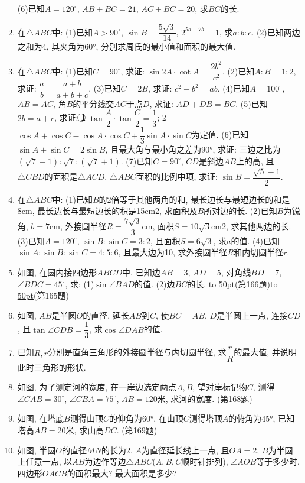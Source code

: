 \documentclass[10pt,a4paper]{article}
\newcommand{\blank}[1]{\underline{\hbox to #1pt{}}}
\begin{document}
\begin{enumerate}[1.]
(6)已知$A=120^\circ$, $AB+BC=21$, $AC+BC=20$, 求$BC$的长.
\item 在$\triangle ABC$中:
(1)已知$A>90^{\circ }$, $\sin B=\dfrac{5\sqrt 3}{14}$, $2^{5a-7b}=1$, 求$a:b:c$.
(2)已知两边之和为4, 其夹角为60°, 分別求周氏的最小值和面积的最大值.
\item 在$\triangle ABC$中:
(1)已知$C=90^{\circ }$, 求证: $\sin 2A\cdot \cot A=\dfrac{2b^2}{c^2}$.
(2)已知$A:B=1:2$, 求证: $\dfrac ab=\dfrac{a+b}{a+b+c}$.
(3)已知$C=2B$, 求证: $c^2-b^2=ab$.
(4)已知$A=100^\circ$, $AB=AC$, 角$B$的平分线交$AC$于点$D$, 求证: $AD+DB=BC$.
(5)已知$2b=a+c$, 求证:
\textcircled{1} $\tan \dfrac A2\cdot \tan \dfrac C2=\dfrac 13$;
\textcircled{2} $\cos A+\cos C-\cos A\cdot \cos C+\dfrac 13\sin A\cdot \sin C$为定值.
(6)已知$\sin A+\sin C=2\sin B$, 且最大角与最小角之差为90°, 求证: 三边之比为$(\sqrt 7-1):\sqrt 7:(\sqrt 7+1)$.
(7)已知$C=90^\circ$, $CD$是斜边$AB$上的高, 且$\triangle CBD$的面积是$\triangle ACD$, $\triangle ABC$面积的比例中项, 求证: $\sin B=\dfrac{\sqrt 5-1}2$.
\item 在$\triangle ABC$中:
(1)已知$B$的2倍等于其他两角的和, 最长边长与最短边长的和是8cm, 最长边长与最短边长的积是15cm2, 求面积及$B$所对边的长.
(2)已知$B$为锐角, $b=7$cm, 外接圆半径$R=\dfrac{7\sqrt 3}3$cm, 面积$S=10\sqrt 3$cm2, 求其他两边的长.
(3)已知$A=120^\circ$, $\sin B:\sin C=3:2$, 且面积$S=6\sqrt 3$, 求$a$的值.
(4)已知$\sin A:\sin B:\sin C=4:5:6$, 且最大边为10, 求外接圆半径$R$和内切圆半径$r$.
\item 如图, 在圆内接四边形$ABCD$中, 已知边$AB=3$, $AD=5$, 对角线$BD=7$, $\angle BDC=45^\circ$, 求:
(1)$\sin \angle BAD$的值.						(2)边$BC$的长.
\blank{50}(第166题)\blank{50}(第165题)
\item 如图, $AB$是半圆$O$的直径, 延长$AB$到$C$, 使$BC=AB$, $D$是半圆上一点, 连接$CD$, 且$\tan \angle CDB=\dfrac 13$, 求$\cos \angle DAB$的值.
\item 已知$R,r$分別是直角三角形的外接圆半径与内切圆半径, 求$\dfrac rR$的最大值, 并说明此时三角形的形状.
\item 如图, 为了测定河的宽度, 在一岸边选定两点$A,B$, 望对岸标记物$C$, 测得$\angle CAB=30^\circ$, $\angle CBA=75^\circ$, $AB=120$米, 求河的宽度.
(第168题)
\item 如图, 在塔底$B$测得山顶$C$的仰角为60°, 在山顶$C$测得塔顶$A$的俯角为45°, 已知塔高$AB=20$米, 求山高$DC$.
(第169题)
\item 如图, 半圆$O$的直径$MN$的长为2, $A$为直径延长线上一点, 且$OA=2$, $B$为半圆上任意一点, 以$AB$为边作等边$\triangle ABC$($A,B,C$顺时针排列), $\angle AOB$等于多少时, 四边形$OACB$的面积最大? 最大面积是多少?

\end{enumerate}
\end{document}

